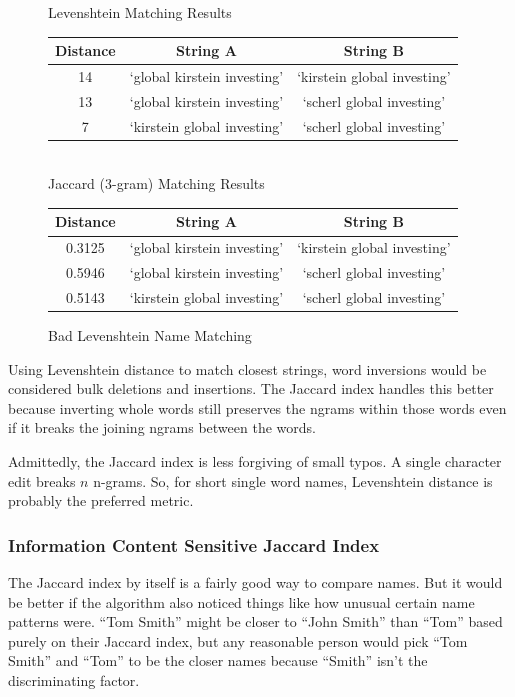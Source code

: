 \documentclass[11pt]{article}
\begin{document}
{\begin{figure}[h!]
\centering
Levenshtein Matching Results\\
\begin{tabular}{c|c|c}
  Distance & String A & String B \\
\hline
  14 & `global kirstein investing' & `kirstein global investing' \\
  13 & `global kirstein investing' & `scherl global investing' \\
  7 & `kirstein global investing' & `scherl global investing'
\end{tabular}
\\
Jaccard (3-gram) Matching Results\\
\begin{tabular}{c|c|c}
  Distance & String A & String B \\
\hline
  0.3125 & `global kirstein investing' & `kirstein global investing' \\
  0.5946 & `global kirstein investing' & `scherl global investing' \\
  0.5143 & `kirstein global investing' & `scherl global investing'
\end{tabular}
\caption{Bad Levenshtein Name Matching}
\label{fig:lev_comp}
\end{figure}

Using Levenshtein distance to match closest strings, word 
inversions would be considered bulk deletions and insertions. 
The Jaccard index handles this better because inverting whole words 
still preserves the ngrams within those words even if it breaks
the joining ngrams between the words.

Admittedly, the Jaccard index is less forgiving of small typos. 
A single character edit breaks $n$ n-grams. So, for short single
word names, Levenshtein distance is probably the preferred metric.

\subsubsection{Information Content Sensitive Jaccard Index}
The Jaccard index by itself is a fairly good way to compare names.
But it would be better if the algorithm also noticed things like
how unusual certain name patterns were. 
``Tom Smith'' might be closer to ``John Smith'' than ``Tom'' based purely
on their Jaccard index, but any reasonable person would pick
``Tom Smith'' and ``Tom'' to be the closer names because ``Smith'' isn't
the discriminating factor.

}
\end{document}
